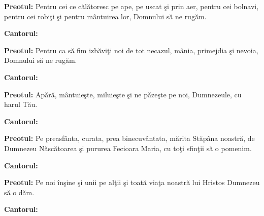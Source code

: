 \documentclass[12pt]{book}
\begin{document}
  \pagebreak

  {\bf Preotul:} Pentru cei ce c\u{a}l\u{a}toresc pe ape, pe uscat
  \c{s}i prin aer, pentru cei bolnavi, pentru cei robi\c{t}i \c{s}i
  pentru m\^{a}ntuirea lor, Domnului s\u{a} ne rug\u{a}m.

  {\bf Cantorul:}
  \begin{figure}[h]
    \begin{center}
    \end{center}
  \end{figure}

  {\bf Preotul:} Pentru ca s\u{a} fim izb\u{a}vi\c{t}i noi de tot
  necazul, m\^{a}nia, primejdia \c{s}i nevoia, Domnului s\u{a} ne
  rug\u{a}m.

  {\bf Cantorul:}
  \begin{figure}[h]
    \begin{center}
    \end{center}
  \end{figure}

  \pagebreak

  {\bf Preotul:} Ap\u{a}r\u{a}, m\^{a}ntuie\c{s}te, miluie\c{s}te
  \c{s}i ne p\u{a}ze\c{s}te pe noi, Dumnezeule, cu harul T\u{a}u.

  {\bf Cantorul:}
  \begin{figure}[h]
    \begin{center}
    \end{center}
  \end{figure}

  {\bf Preotul:} Pe preasf\^{a}nta, curata, prea binecuv\^{a}ntata,
  m\u{a}rita St\u{a}p\^{a}na noastr\u{a}, de Dumnezeu
  N\u{a}sc\u{a}toarea \c{s}i pururea Fecioara Maria, cu to\c{t}i
  sfin\c{t}ii s\u{a} o pomenim.

  {\bf Cantorul:}
  \begin{figure}[h]
    \begin{center}
    \end{center}
  \end{figure}

  \pagebreak

  {\bf Preotul:} Pe noi \^{i}n\c{s}ine \c{s}i unii pe al\c{t}ii
  \c{s}i toat\u{a} via\c{t}a noastr\u{a} lui Hristos Dumnezeu s\u{a} o
  d\u{a}m.

  {\bf Cantorul:}
  \begin{figure}[h]
    \begin{center}
    \end{center}
  \end{figure}
\end{document}
